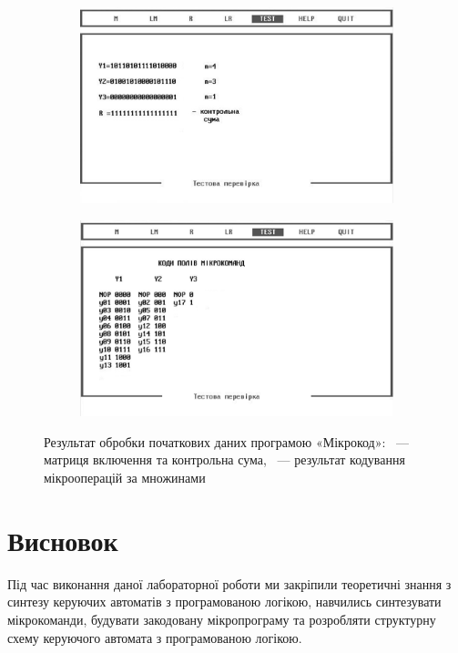 \documentclass[a4paper,oneside,DIV=12,12pt,headings=normal]{scrartcl}
\begin{document}
			\begin{figure}[!htbp]
			\centering
				\begin{subfigure}[t]{0.5\linewidth - 1em}
				\centering
					\includegraphics[width = \linewidth]{./assets/00-bw.png}
				\caption{}
				\label{subfig:mikrokod-result-00}
				\end{subfigure}
				\quad
				\begin{subfigure}[t]{0.5\linewidth - 1em}
				\centering
					\includegraphics[width = \linewidth]{./assets/01-bw.png}
				\caption{}
				\label{subfig:mikrokod-result-01}
				\end{subfigure}
			\caption{Результат обробки початкових даних програмою «Мікрокод»: ~— матриця включення та контрольна сума, ~— результат кодування мікрооперацій за множинами}
			\label{fig:mikrokod-result}
			\end{figure}
			
	\section{Висновок}
		Під час виконання даної лабораторної роботи ми закріпили теоретичні знання з синтезу керуючих автоматів з програмованою логікою, навчились синтезувати мікрокоманди, будувати закодовану мікропрограму та розробляти структурну схему керуючого автомата з програмованою логікою.
\end{document}
